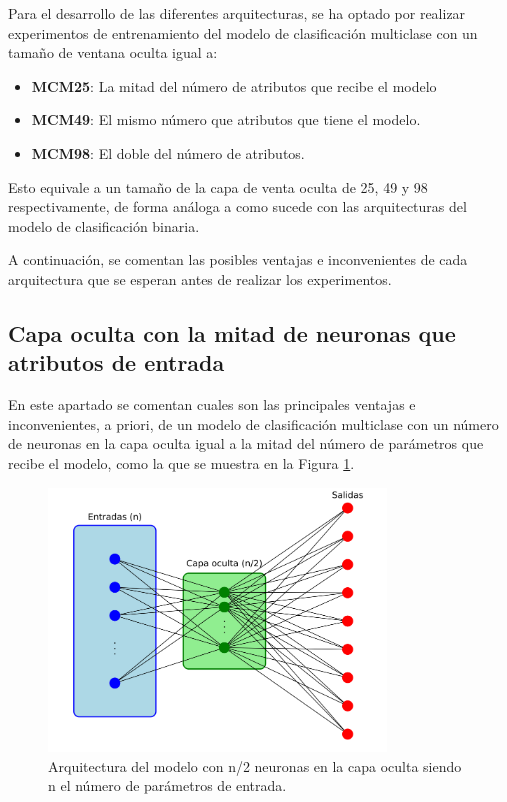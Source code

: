 Para el desarrollo de las diferentes arquitecturas, se ha optado por realizar experimentos de entrenamiento del modelo de clasificación multiclase con un tamaño de ventana oculta igual a:

\begin{itemize}

	\item \textbf{MCM25}: La mitad del número de atributos que recibe el modelo
	\item \textbf{MCM49}: El mismo número que atributos que tiene el modelo.
	\item \textbf{MCM98}: El doble del número de atributos. 

\end{itemize}

Esto equivale a un tamaño de la capa de venta oculta de 25, 49 y 98 respectivamente, de forma análoga a como sucede con las arquitecturas del modelo de clasificación binaria.

A continuación, se comentan las posibles ventajas e inconvenientes de cada arquitectura que se esperan antes de realizar los experimentos.

\subsection{Capa oculta con la mitad de neuronas que atributos de entrada}\label{sec:VIMUL25}
En este apartado se comentan cuales son las principales ventajas e inconvenientes, a priori, de un modelo de clasificación multiclase con un número de neuronas en la capa oculta igual a la mitad del número de parámetros que recibe el modelo, como la que se muestra en la Figura \ref{fig:arqnmediosMUL}.

\begin{figure}[H]
    \centering
    \includegraphics[width=0.8\textwidth]{./img/modelo/arquitecturas/arqnmediosMUL.pdf}
    \caption{Arquitectura del modelo con n/2 neuronas en la capa oculta siendo n el número de parámetros de entrada.}
    \label{fig:arqnmediosMUL}
\end{figure}

